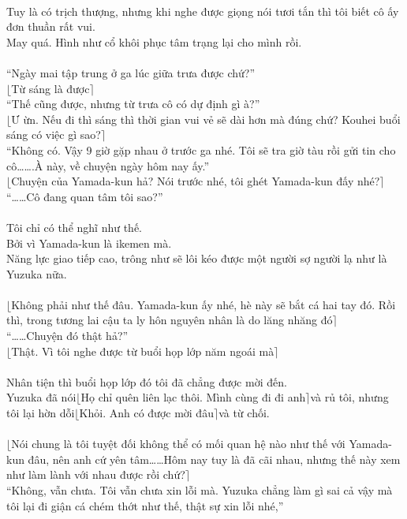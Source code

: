 \documentclass[12pt,a4paper, twosides]{book}
\begin{document}
\\
Tuy là có trịch thượng, nhưng khi nghe được giọng nói tươi tắn thì tôi biết cô ấy đơn thuần rất vui.\\
May quá. Hình như cổ khôi phục tâm trạng lại cho mình rồi.\\
\\
“Ngày mai tập trung ở ga lúc giữa trưa được chứ?”\\
$\lfloor$Từ sáng là được$\rceil$\\
“Thế cũng được, nhưng từ trưa cô có dự định gì à?”\\
$\lfloor$Ư ừn. Nếu đi thì sáng thì thời gian vui vẻ sẽ dài hơn mà đúng chứ? Kouhei buổi sáng có việc gì sao?$\rceil$\\
“Không có. Vậy 9 giờ gặp nhau ở trước ga nhé. Tôi sẽ tra giờ tàu rồi gửi tin cho cô…….À này, về chuyện ngày hôm nay ấy.”\\
$\lfloor$Chuyện của Yamada-kun hả? Nói trước nhé, tôi ghét Yamada-kun đấy nhé?$\rceil$\\
“……Cô đang quan tâm tôi sao?”\\
\\
Tôi chỉ có thể nghĩ như thế.\\
Bởi vì Yamada-kun là ikemen mà.\\
Năng lực giao tiếp cao, trông như sẽ lôi kéo được một người sợ người lạ như là Yuzuka nữa.\\
\\
$\lfloor$Không phải như thế đâu. Yamada-kun ấy nhé, hè này sẽ bắt cá hai tay đó. Rồi thì, trong tương lai cậu ta ly hôn nguyên nhân là do lăng nhăng đó$\rceil$\\
“……Chuyện đó thật hả?”\\
$\lfloor$Thật. Vì tôi nghe được từ buổi họp lớp năm ngoái mà$\rceil$\\
\\
Nhân tiện thì buổi họp lớp đó tôi đã chẳng được mời đến.\\
Yuzuka đã nói$\lfloor$Họ chỉ quên liên lạc thôi. Mình cùng đi đi anh$\rceil$và rủ tôi, nhưng tôi lại hờn dỗi$\lfloor$Khỏi. Anh có được mời đâu$\rceil$và từ chối.\\
\\
$\lfloor$Nói chung là tôi tuyệt đối không thể có mối quan hệ nào như thế với Yamada-kun đâu, nên anh cứ yên tâm……Hôm nay tuy là đã cãi nhau, nhưng thế này xem như làm lành với nhau được rồi chứ?$\rceil$\\
“Không, vẫn chưa. Tôi vẫn chưa xin lỗi mà. Yuzuka chẳng làm gì sai cả vậy mà tôi lại đi giận cá chém thớt như thế, thật sự xin lỗi nhé,”\\
\end{document}
